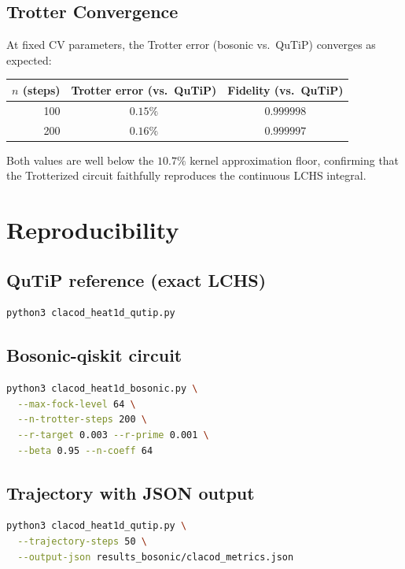 \documentclass[11pt]{article}
\begin{document}
\subsection{Trotter Convergence}

At fixed CV parameters, the Trotter error (bosonic vs.\ QuTiP) converges
as expected:

\begin{center}
\begin{tabular}{rcc}
  \toprule
  $n$ (steps) & Trotter error (vs.\ QuTiP) & Fidelity (vs.\ QuTiP) \\
  \midrule
  100 & $0.15\%$ & $0.999998$ \\
  200 & $0.16\%$ & $0.999997$ \\
  \bottomrule
\end{tabular}
\end{center}

Both values are well below the $10.7\%$ kernel approximation floor, confirming
that the Trotterized circuit faithfully reproduces the continuous LCHS integral.

\section{Reproducibility}

\subsection{QuTiP reference (exact LCHS)}
\begin{lstlisting}[language=bash]
python3 clacod_heat1d_qutip.py
\end{lstlisting}

\subsection{Bosonic-qiskit circuit}
\begin{lstlisting}[language=bash]
python3 clacod_heat1d_bosonic.py \
  --max-fock-level 64 \
  --n-trotter-steps 200 \
  --r-target 0.003 --r-prime 0.001 \
  --beta 0.95 --n-coeff 64
\end{lstlisting}

\subsection{Trajectory with JSON output}
\begin{lstlisting}[language=bash]
python3 clacod_heat1d_qutip.py \
  --trajectory-steps 50 \
  --output-json results_bosonic/clacod_metrics.json
\end{lstlisting}
\end{document}
